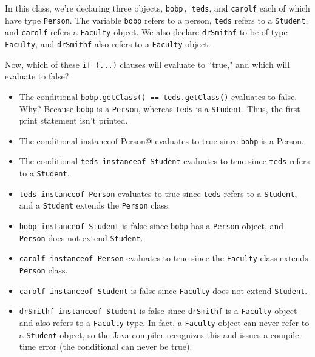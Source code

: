 In this class, we're declaring three objects, \verb!bobp, teds!, and \verb!carolf! each of which have type \verb!Person!. The variable \verb!bobp! refers to a person, \verb!teds! refers to a \verb!Student!, and \verb!carolf! refers a \verb!Faculty! object. We also declare \verb!drSmithf! to be of type \verb!Faculty!, and \verb!drSmithf! also refers to a \verb!Faculty! object.


Now, which of these \verb!if (...)! clauses will evaluate to ``true," and which will evaluate to false? 
\begin{itemize}
    \item The conditional \verb!bobp.getClass() == teds.getClass()! evaluates to false. Why? Because \verb!bobp! is a \verb!Person!, whereas \verb!teds! is a  \verb!Student!. Thus, the first print statement isn't printed.
    \item The conditional \verb@bobp instanceof Person@ evaluates to true since \verb!bobp! is a Person.
    \item The conditional \verb!teds instanceof Student! evaluates to true since \verb!teds! refers to a \verb!Student!.
    \item \verb!teds instanceof Person! evaluates to true since \verb!teds! refers to a \verb!Student!, and a \verb!Student! extends the \verb!Person! class.
    \item \verb!bobp instanceof Student! is false since \verb!bobp! has a \verb!Person! object, and \verb!Person! does not extend \verb!Student!.
    \item \verb!carolf instanceof Person! evaluates to true since the \verb!Faculty! class extends \verb!Person! class. 
    \item \verb!carolf instanceof Student! is false since \verb!Faculty! does not extend \verb!Student!.
    \item \verb!drSmithf instanceof Student! is false since \verb!drSmithf! is a \verb!Faculty! object and also refers to a \verb!Faculty! type. In fact, a \verb!Faculty! object can never refer to a \verb!Student! object, so the Java compiler recognizes this and issues a compile-time error (the conditional can never be true).
\end{itemize}

